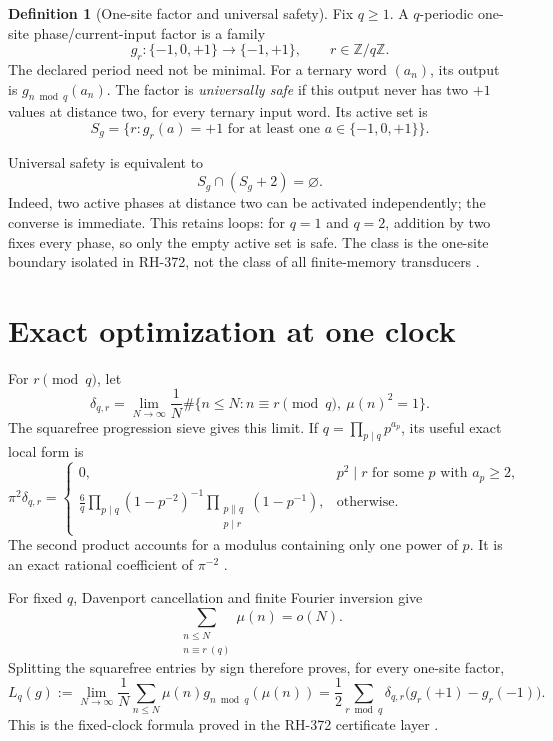 \documentclass[11pt]{article}
\theoremstyle{definition}
\newtheorem{definition}[theorem]{Definition}
\theoremstyle{remark}
\newcommand{\Mob}{\mu}
\newcommand{\Z}{\mathbb Z}
\newcommand{\dd}{\delta}
\begin{document}
\begin{definition}[One-site factor and universal safety]
Fix $q\ge1$.  A $q$-periodic one-site phase/current-input factor is a family
\[
       g_r:\{-1,0,+1\}\longrightarrow\{-1,+1\},
       \qquad r\in\Z/q\Z.
\]
The declared period need not be minimal.  For a ternary word $(a_n)$, its
output is $g_{n\bmod q}(a_n)$.  The factor is \emph{universally safe} if this
output never has two $+1$ values at distance two, for every ternary input
word.  Its active set is
\[
 S_g=\{r:g_r(a)=+1\text{ for at least one }a\in\{-1,0,+1\}\}.
\]
\end{definition}

Universal safety is equivalent to
\begin{equation}
                       S_g\cap(S_g+2)=\varnothing.
 \label{eq:active-independent}
\end{equation}
Indeed, two active phases at distance two can be activated independently;
the converse is immediate.  This retains loops: for $q=1$ and $q=2$,
addition by two fixes every phase, so only the empty active set is safe.
The class is the one-site boundary isolated in RH-372, not the class of all
finite-memory transducers \cite{RH372}.

\section{Exact optimization at one clock}

For $r\pmod q$, let
\begin{equation}
 \dd_{q,r}=\lim_{N\to\infty}\frac1N
 \#\{n\le N:n\equiv r\pmod q,\ \Mob(n)^2=1\}.
 \label{eq:density}
\end{equation}
The squarefree progression sieve gives this limit.  If
$q=\prod_{p\mid q}p^{a_p}$, its useful exact local form is
\begin{equation}
 \pi^2\dd_{q,r}=
 \begin{cases}
 0,&p^2\mid r\text{ for some }p\text{ with }a_p\ge2,\\[2mm]
 \displaystyle\frac6q
 \prod_{p\mid q}(1-p^{-2})^{-1}
 \prod_{\substack{p\parallel q\\p\mid r}}(1-p^{-1}),&\text{otherwise}.
 \end{cases}
 \label{eq:local-density}
\end{equation}
The second product accounts for a modulus containing only one power of $p$.
It is an exact rational coefficient of $\pi^{-2}$ \cite{Mirsky1948}.

For fixed $q$, Davenport cancellation and finite Fourier inversion give
\[
 \sum_{\substack{n\le N\\n\equiv r\ (q)}}\Mob(n)=o(N).
\]
Splitting the squarefree entries by sign therefore proves, for every
one-site factor,
\begin{equation}
 L_q(g):=\lim_{N\to\infty}\frac1N\sum_{n\le N}
 \Mob(n)g_{n\bmod q}(\Mob(n))
 =\frac12\sum_{r\bmod q}\dd_{q,r}
       \bigl(g_r(+1)-g_r(-1)\bigr).
 \label{eq:factor-limit}
\end{equation}
This is the fixed-clock formula proved in the RH-372 certificate layer
\cite{Davenport1937,RH372}.
\end{document}
